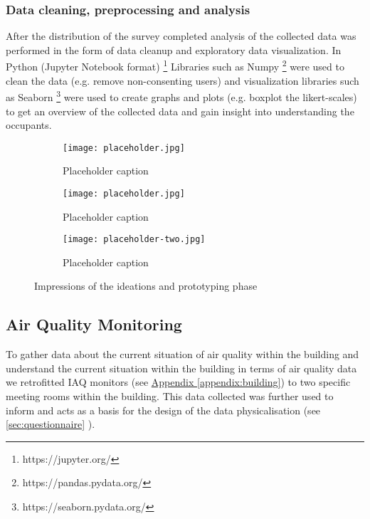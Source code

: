 \subsubsection{Data cleaning, preprocessing and analysis}
\label{sec:analysis}
After the distribution of the survey completed analysis of the collected data was performed in the form of data cleanup and exploratory data visualization. In Python (Jupyter Notebook format) \footnote{https://jupyter.org/} Libraries such as Numpy \footnote{https://pandas.pydata.org/} were used to clean the data (e.g. remove non-consenting users) and visualization libraries such as Seaborn \footnote{https://seaborn.pydata.org/} were used to create graphs and plots (e.g. boxplot the likert-scales) to get an overview of the collected data and gain insight into understanding the occupants.

\begin{figure*}[!t]
    \centering
    \begin{subfigure}[b]{0.23\textwidth}
        \texttt{[image: placeholder.jpg]}
        \caption{Placeholder caption}
        \label{fig:1}
    \end{subfigure}
    \hfill
    \begin{subfigure}[b]{0.23\textwidth}
        \texttt{[image: placeholder.jpg]}
        \caption{Placeholder caption}
        \label{fig:2}
    \end{subfigure}
    \hfill
    \begin{subfigure}[b]{0.5\textwidth}
        \texttt{[image: placeholder-two.jpg]}
        \caption{Placeholder caption}
        \label{fig:3_4_combined}
    \end{subfigure}
    \caption{Impressions of the ideations and prototyping phase}
    \label{fig:full_width}
\end{figure*}

\subsection{Air Quality Monitoring}

To gather data about the current situation of air quality within the building and understand the current situation within the building in terms of air quality data we retrofitted IAQ monitors (see \hyperref[appendix:building]{Appendix \ref*{appendix:building}}) to two specific meeting rooms within the building.  This data collected was further used to inform and acts as a basis for the design of the data physicalisation (see \ref{sec:questionnaire} ).

